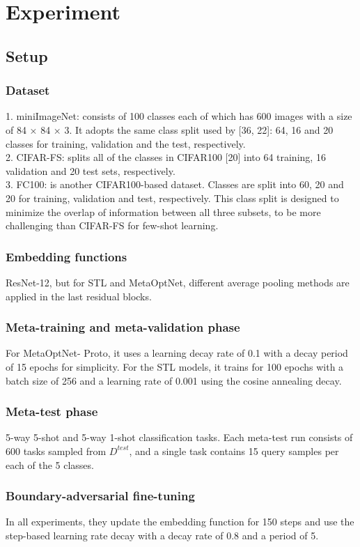\documentclass{article}
\begin{document}
\section{Experiment}
\subsection{Setup}
\subsubsection{Dataset}
1. miniImageNet: consists of 100 classes each of which has 600 images with a size of 84 × 84 × 3. It adopts the same class split used by [36, 22]: 64, 16 and 20 classes for training, validation and the test, respectively. \\
2. CIFAR-FS: splits all of the classes in CIFAR100 [20] into 64 training, 16 validation and 20 test sets, respectively. \\
3. FC100: is another CIFAR100-based dataset. Classes are split into 60, 20 and 20 for training, validation and test, respectively. This class split is designed to minimize the overlap of information between all three subsets, to be more challenging than CIFAR-FS for few-shot learning. \\
\subsubsection{Embedding functions}
ResNet-12, but for STL and MetaOptNet, different average pooling methods are applied in the last residual blocks. \\
\subsubsection{Meta-training and meta-validation phase}
For MetaOptNet- Proto, it uses a learning decay rate of 0.1 with a decay period of 15 epochs for simplicity. For the STL models, it trains for 100 epochs with a batch size of 256 and a learning rate of 0.001 using the cosine annealing decay. \\
\subsubsection{Meta-test phase}
5-way 5-shot and 5-way 1-shot classification tasks. Each meta-test run consists of 600 tasks sampled from $D^{test}$, and a single task contains 15 query samples per each of the 5 classes. \\
\subsubsection{Boundary-adversarial fine-tuning}
In all experiments, they update the embedding function for 150 steps and use the step-based learning rate decay with a decay rate of 0.8 and a period of 5. \\
\end{document}
